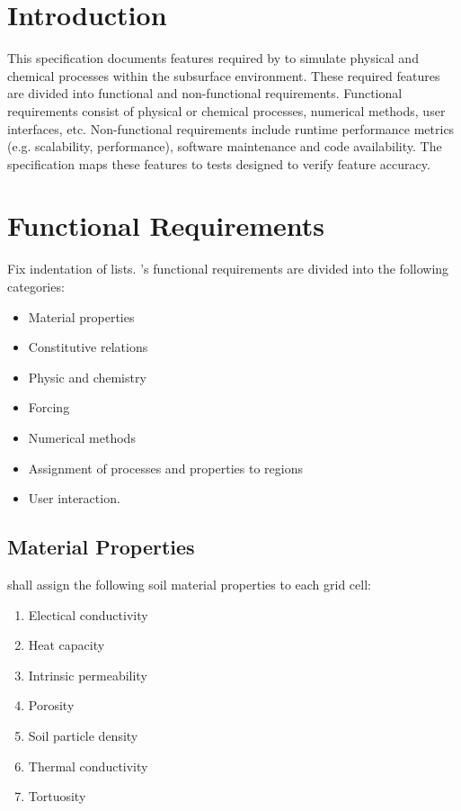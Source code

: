 \section{Introduction}
This specification documents features required by \pft to simulate physical and chemical processes within the subsurface environment. These required features are divided into functional and non-functional requirements. Functional requirements consist of physical or chemical processes, numerical methods, user interfaces, etc.  Non-functional requirements include runtime performance metrics (e.g. scalability,  performance), software maintenance and code availability. The specification maps these features to tests designed to verify feature accuracy.

\section{Functional Requirements}
{\Huge \color{red} Fix indentation of lists.}\newline
\pft’s functional requirements are divided into the following categories:
\begin{itemize}[label=\pftitemlabel]
	\item Material properties
	\item Constitutive relations
	\item Physic and chemistry
	\item Forcing
	\item Numerical methods
	\item Assignment of processes and properties to regions
	\item User interaction.
\end{itemize}

\subsection{Material Properties}
\pft shall assign the following soil material properties to each grid cell:
\begin{enumerate}
	\item \label{mp_electrical_conductivity} Electical conductivity
	\item \label{mp_heat_capacity} Heat capacity
	\item \label{mp_permeability} Intrinsic permeability
	\item \label{mp_porosity} Porosity
	\item \label{mp_soil_particle_density} Soil particle density
	\item \label{mp_thermal_conductivity} Thermal conductivity
	\item \label{mp_tortuosity} Tortuosity
\end{enumerate}


